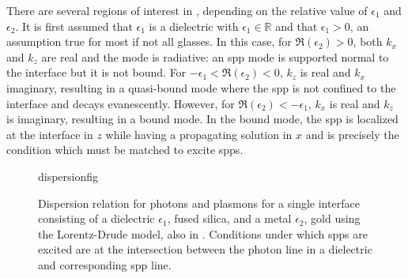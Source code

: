 There are several regions of interest in ,
depending on the relative value of $\epsilon_1$ and $\epsilon_2$.  It is
first assumed that $\epsilon_1$ is a dielectric with
$\epsilon_1\in\mathbb{R}$ and that $\epsilon_1 > 0$, an assumption true for
most if not all glasses.  In this case, for $\Re(\epsilon_2)>0$, both $k_x$
and $k_z$ are real and the mode is radiative: an \gls{spp} mode is supported
normal to the interface but it is not bound.  For
$-\epsilon_1<\Re(\epsilon_2)<0$, $k_z$ is real and $k_x$ imaginary,
resulting in a quasi-bound mode where the \gls{spp} is not confined to the
interface and decays evanescently.  However, for
$\Re(\epsilon_2)<-\epsilon_1$, $k_x$ is real and $k_z$ is imaginary,
resulting in a bound mode.  In the bound mode, the \gls{spp} is localized at the
interface in $z$ while having a propagating solution in $x$ and is
precisely the condition which must be matched to excite \glspl{spp}.
\begin{figure}[ht]
\centering
{dispersionfig}
\caption{Dispersion relation for photons and plasmons for a single interface consisting of a dielectric $\epsilon_1$, fused silica, and a metal $\epsilon_2$, gold using the Lorentz-Drude model, also in . Conditions under which \glspl{spp} are excited are at the intersection between the photon line in a dielectric and corresponding \gls{spp} line.}
\label{fig:dispersionrelation}
\end{figure}
